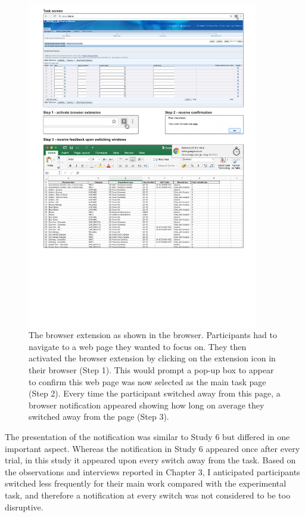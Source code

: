 \begin{figure}
\centering
\centerline{\includegraphics[width=0.9\textwidth]{images/ch56/ch56-7_taskinterface.pdf}}
\caption[Study 7 browser extension]{The browser extension as shown in the browser. Participants had to navigate to a web page they wanted to focus on. They then activated the browser extension by clicking on the extension icon in their browser (Step 1). This would prompt a pop-up box to appear to confirm this web page was now selected as the main task page (Step 2). Every time the participant switched away from this page, a browser notification appeared showing how long on average they switched away from the page (Step 3).}
\label{fig:ch56-7_taskinterface}
\end{figure}

The presentation of the notification was similar to Study 6 but differed in one important aspect. Whereas the notification in Study 6 appeared once after every trial, in this study it appeared upon every switch away from the task. Based on the observations and interviews reported in Chapter 3, I anticipated participants switched less frequently for their main work compared with the experimental task, and therefore a notification at every switch was not considered to be too disruptive.


